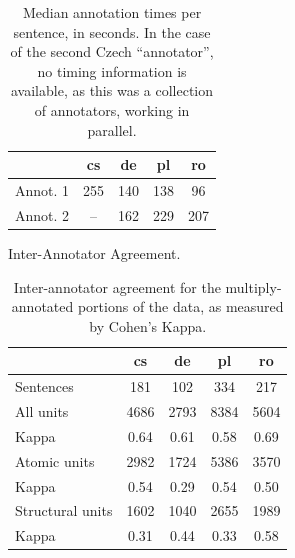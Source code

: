 \documentclass[11pt,letterpaper]{article}
\makeatletter
\renewcommand{\paragraph}{
  \@startsection{paragraph}{4}
  {\z@}{.3ex \@plus .3ex \@minus .2ex}{-1em}
  {\normalfont\normalsize\bfseries}
}
\newcommand{\XXX}[1]{{\color{red}XXX #1}} %
\newcommand{\oa}[1]{}
\makeatother
\begin{document}

\begin{table}[t]
\begin{center}
{\small
\begin{tabular}{l|cccc}
& cs & de & pl & ro \\
\hline
Annot. 1 & 255 & 140  & 138 & 96 \\
Annot. 2 & -- & 162 & 229 & 207 \\
\end{tabular}
\caption{Median annotation times per sentence, in seconds.
  In the case of the second Czech 
  ``annotator'', no timing information is available, as
  this was a collection of annotators, working in parallel.}
\label{tab:annot_times}
}
\end{center}
\end{table}




\paragraph{Inter-Annotator Agreement.}
\label{sec:iaa}

\begin{table}[t]
\begin{center}
{\small
\begin{tabular}{l|cccc}
 & cs & de & pl & ro \\
\hline
Sentences & 181 & 102 & 334 & 217 \\
\hline
All units & 4686   & 2793   & 8384   & 5604  \\
Kappa & 0.64   & 0.61   & 0.58   & 0.69  \\
\hline
Atomic units & 2982 & 1724 & 5386 & 3570 \\
Kappa & 0.54 & 0.29 & 0.54 & 0.50 \\
\hline
Structural units & 1602 & 1040 & 2655 & 1989 \\
Kappa & 0.31 & 0.44 & 0.33 & 0.58 \\
\end{tabular}
\caption{Inter-annotator agreement for the multiply-annotated portions of the data, as
measured by Cohen's Kappa. }
\label{tab:iaa}
}
\end{center}
\end{table}

\end{document}
